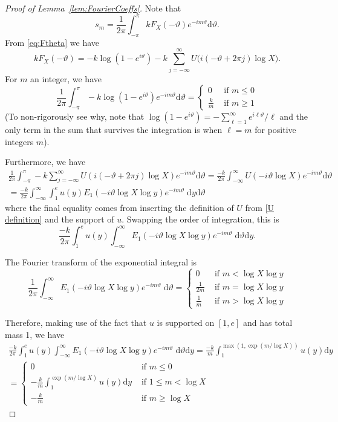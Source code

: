 \documentclass[12pt,a4paper,reqno]{amsart}
\theoremstyle{remark}
\numberwithin{equation}{section}
\newcommand{\ii}{i}
\newcommand{\dd}{\mathrm{d}}
\begin{document}
\begin{proof}[Proof of Lemma~\ref{lem:FourierCoeffs}]
Note that
\[
s_m = \frac{1}{2\pi} \int_{-\pi}^\pi k F_X(-\vartheta) e^{-\ii m \vartheta} \dd \vartheta .
\]
From \eqref{eq:Ftheta} we have
\[
k F_X(-\vartheta) =  - k\log\left(1-e^{\ii \vartheta} \right) -k \sum_{j=-\infty}^\infty U\big(\ii(-\vartheta + 2\pi j)\log X\big) .
\]
For $m$ an integer, we have
\begin{equation}\label{eq:FourierCoeffLog}
\frac{1}{2\pi} \int_{-\pi}^\pi -k \log\left(1-e^{\ii \vartheta} \right) e^{-\ii m \vartheta} \dd\vartheta =
\begin{cases}
    0 & \text{ if } m \leq 0\\
    \frac{k}{m} & \text{ if } m \geq 1
\end{cases}
\end{equation}
(To non-rigorously see why, note that $\log\left(1-e^{\ii \vartheta} \right) = -\sum_{\ell=1}^\infty e^{\ii \ell \vartheta}/\ell$ and the only term in the sum that survives the integration is when $\ell=m$ for positive integers $m$).

Furthermore, we have
\begin{multline*}
\frac{1}{2\pi}  \int_{-\pi}^\pi -k \sum_{j=-\infty}^\infty U\left(\ii(-\vartheta+2\pi j) \log X \right) e^{-\ii m \vartheta} \dd\vartheta
= \frac{-k}{2\pi}
\int_{-\infty}^\infty U(-\ii \vartheta \log X) e^{-\ii m \vartheta} \dd\vartheta\\
= \frac{-k}{2\pi} \int_{-\infty}^\infty \int_1^e u(y) E_1(-\ii \vartheta \log X\log y) e^{-\ii m \vartheta} \;\dd y \dd\vartheta
\end{multline*}
where the final equality comes from inserting the definition of $U$ from \eqref{U definition} and the support of $u$. Swapping the order of integration, this is
\[
\frac{-k}{2\pi}  \int_1^e u(y) \int_{-\infty}^\infty E_1(-\ii \vartheta \log X\log y) e^{-\ii m \vartheta} \; \dd\vartheta \dd y .
\]

The Fourier transform of the exponential integral is
\[
\frac{1}{2\pi} \int_{-\infty}^\infty E_1(-\ii \vartheta \log X\log y) e^{-\ii m \vartheta} \; \dd\vartheta  =
\begin{cases}
    0 & \text{ if } m<\log X \log y\\
    \frac{1}{2m} & \text{ if } m = \log X \log y\\
    \frac{1}{m} & \text{ if } m > \log X \log y
\end{cases}
\]

Therefore, making use of the fact that $u$ is supported on $[1,e]$ and has total mass 1, we have
\begin{multline*}
\frac{-k}{2\pi}  \int_1^e u(y) \int_{-\infty}^\infty E_1(-\ii \vartheta \log X\log y) e^{-\ii m \vartheta} \; \dd\vartheta \dd y = \frac{-k}{m} \int_1^{\max(1,\exp(m/\log X))} u(y) \dd y \\
=\begin{cases}
    0 & \text{ if } m \leq 0 \\
    -\frac{k}{m} \int_1^{\exp(m/\log X)} u(y) \dd y & \text{ if } 1 \leq m < \log X \\
    -\frac{k}{m}  & \text{ if } m \geq \log X
\end{cases}
\end{multline*}


\end{proof}
\end{document}
